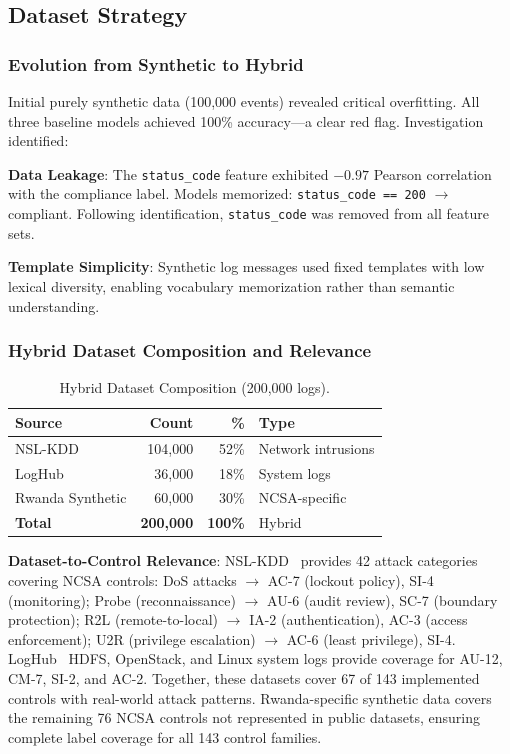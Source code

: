 \documentclass[futureinternet,article,submit,pdftex,moreauthors]{Definitions/mdpi}
\begin{document}
\subsection{Dataset Strategy}

\subsubsection{Evolution from Synthetic to Hybrid}

Initial purely synthetic data (100{,}000 events) revealed critical overfitting. All three
baseline models achieved 100\% accuracy---a clear red flag. Investigation identified:

\textbf{Data Leakage}: The \texttt{status\_code} feature exhibited $-0.97$ Pearson correlation
with the compliance label. Models memorized: \texttt{status\_code == 200} $\rightarrow$
compliant. Following identification, \texttt{status\_code} was removed from all feature sets.

\textbf{Template Simplicity}: Synthetic log messages used fixed templates with low lexical
diversity, enabling vocabulary memorization rather than semantic understanding.

\subsubsection{Hybrid Dataset Composition and Relevance}

\begin{table}[H]
\caption{Hybrid Dataset Composition (200{,}000 logs).\label{tab:dataset}}
\begin{tabularx}{\textwidth}{lrrX}
\toprule
\textbf{Source} & \textbf{Count} & \textbf{\%} & \textbf{Type} \\
\midrule
NSL-KDD~\cite{nslkdd} & 104{,}000 & 52\% & Network intrusions \\
LogHub~\cite{loghub} & 36{,}000 & 18\% & System logs \\
Rwanda Synthetic & 60{,}000 & 30\% & NCSA-specific \\
\midrule
\textbf{Total} & \textbf{200{,}000} & \textbf{100\%} & Hybrid \\
\bottomrule
\end{tabularx}
\end{table}

\textbf{Dataset-to-Control Relevance}: NSL-KDD~\cite{nslkdd} provides 42 attack categories
covering NCSA controls: DoS attacks $\rightarrow$ AC-7 (lockout policy), SI-4 (monitoring);
Probe (reconnaissance) $\rightarrow$ AU-6 (audit review), SC-7 (boundary protection);
R2L (remote-to-local) $\rightarrow$ IA-2 (authentication), AC-3 (access enforcement);
U2R (privilege escalation) $\rightarrow$ AC-6 (least privilege), SI-4. LogHub~\cite{loghub}
HDFS, OpenStack, and Linux system logs provide coverage for AU-12, CM-7, SI-2, and AC-2.
Together, these datasets cover 67 of 143 implemented controls with real-world attack patterns.
Rwanda-specific synthetic data covers the remaining 76 NCSA controls not represented in
public datasets, ensuring complete label coverage for all 143 control families.
\end{document}
